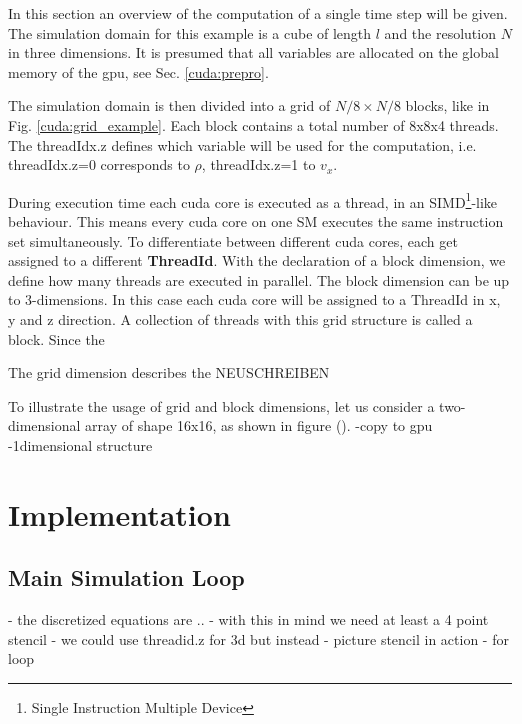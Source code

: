 In this section an overview of the computation of a single time step will be given.
The simulation domain for this example is a cube of length $l$ and the resolution $N$ in three dimensions.
It is presumed that all variables are allocated on the global memory of the gpu, see Sec. \ref{cuda:prepro}.

The simulation domain is then divided into a grid of  $N/8 \times N/8$ blocks, like in Fig. \ref{cuda:grid_example}.
Each block contains a total number of 8x8x4 threads.
The threadIdx.z defines which variable will be used for the computation, i.e. threadIdx.z=0 corresponds to $\rho$, threadIdx.z=1 to $v_x$.










\clearpage

During execution time each cuda core is executed as a thread, in an SIMD\footnote{Single Instruction Multiple Device}-like behaviour.
This means every cuda core on one SM executes the same instruction set simultaneously. To differentiate between different cuda cores,
each get assigned to a different \textbf{ThreadId}.
With the declaration of a block dimension, we define how many threads are executed in parallel.
The block dimension can be up to 3-dimensions. In this case each cuda core will be assigned to a ThreadId in x, y and z direction.
A collection of threads with this grid structure is called a block.
Since the

The grid dimension describes the
NEUSCHREIBEN


To illustrate the usage of grid and block dimensions, let us consider a two-dimensional array of shape 16x16, as shown in figure ().
-copy to gpu
-1dimensional structure

\section{Implementation}

\subsection{Main Simulation Loop}
- the discretized equations are ..
- with this in mind we need at least a 4 point stencil
- we could use threadid.z for 3d but instead
- picture stencil in action
- for loop

